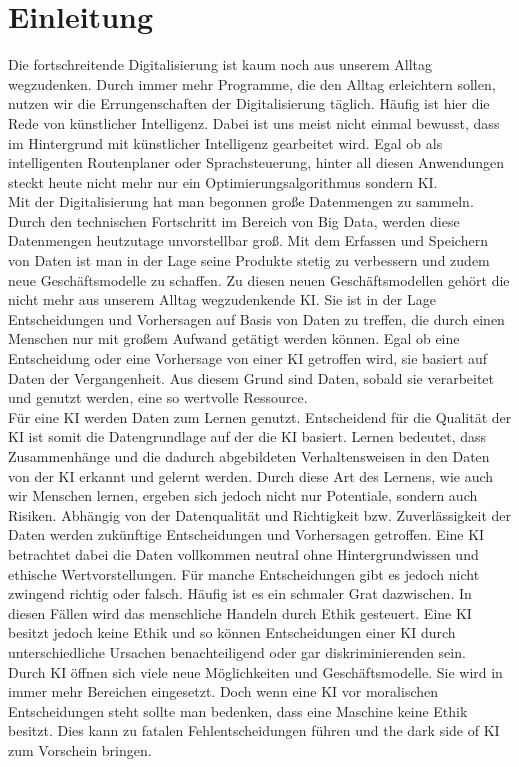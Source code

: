 \chapter{Einleitung}
\begin{onehalfspace}    
    \label{sec:einleitung}
        Die fortschreitende Digitalisierung ist kaum noch aus unserem Alltag wegzudenken. Durch immer mehr Programme, die den Alltag erleichtern sollen, nutzen wir die Errungenschaften der Digitalisierung täglich. Häufig ist hier die Rede von künstlicher Intelligenz. Dabei ist uns meist nicht einmal bewusst, dass im Hintergrund mit künstlicher Intelligenz gearbeitet wird. Egal ob als intelligenten Routenplaner oder Sprachsteuerung, hinter all diesen Anwendungen steckt heute nicht mehr nur ein Optimierungsalgorithmus sondern \ac{KI}.\cite{Horn2022}
        \\
        Mit der Digitalisierung hat man begonnen große Datenmengen zu sammeln. Durch den technischen Fortschritt im Bereich von Big Data, werden diese Datenmengen heutzutage unvorstellbar groß. Mit dem Erfassen und Speichern von Daten ist man in der Lage seine Produkte stetig zu verbessern und zudem neue Geschäftsmodelle zu schaffen. Zu diesen neuen Geschäftsmodellen gehört die nicht mehr aus unserem Alltag wegzudenkende \ac{KI}. Sie ist in der Lage Entscheidungen und Vorhersagen auf Basis von Daten zu treffen, die durch einen Menschen nur mit großem Aufwand getätigt werden können.  Egal ob eine Entscheidung oder eine Vorhersage von einer \ac{KI} getroffen wird, sie basiert auf Daten der Vergangenheit. Aus diesem Grund sind Daten, sobald sie verarbeitet und genutzt werden, eine so wertvolle Ressource.\cite{Otto2019}
        \\
        Für eine \ac*{KI} werden Daten zum Lernen genutzt. Entscheidend für die Qualität der \ac*{KI} ist somit die Datengrundlage auf der die \ac*{KI} basiert. Lernen bedeutet, dass Zusammenhänge und die dadurch abgebildeten Verhaltensweisen in den Daten von der \ac*{KI} erkannt und gelernt werden. Durch diese Art des Lernens, wie auch wir Menschen lernen, ergeben sich jedoch nicht nur Potentiale, sondern auch Risiken. Abhängig von der Datenqualität und Richtigkeit bzw. Zuverlässigkeit der Daten werden zukünftige Entscheidungen und Vorhersagen getroffen. Eine \ac*{KI} betrachtet dabei die Daten vollkommen neutral ohne Hintergrundwissen und ethische Wertvorstellungen. Für manche Entscheidungen gibt es jedoch nicht zwingend richtig oder falsch. Häufig ist es ein schmaler Grat dazwischen. In diesen Fällen wird das menschliche Handeln durch Ethik gesteuert. Eine \ac*{KI} besitzt jedoch keine Ethik und so können Entscheidungen einer KI durch unterschiedliche Ursachen benachteiligend oder gar diskriminierenden sein.\cite{Cremers2019}
        \\
        Durch \ac*{KI} öffnen sich viele neue Möglichkeiten und Geschäftsmodelle. Sie wird in immer mehr Bereichen eingesetzt. Doch wenn eine \ac*{KI} vor moralischen Entscheidungen steht sollte man bedenken, dass eine Maschine keine Ethik besitzt. Dies kann zu fatalen Fehlentscheidungen führen und \glqq{}the dark side of \ac*{KI}\grqq{} zum Vorschein bringen.


\end{onehalfspace}
